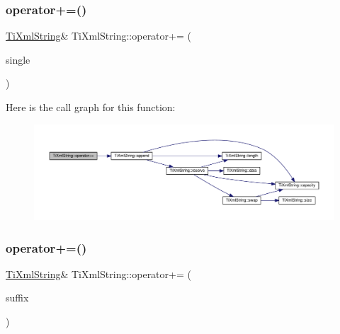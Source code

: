 \subsubsection{\texorpdfstring{operator+=()}{operator+=()}\hspace{0.1cm}{\footnotesize\ttfamily [2/3]}}
{\footnotesize\ttfamily \hyperlink{class_ti_xml_string}{Ti\+Xml\+String}\& Ti\+Xml\+String\+::operator+= (\begin{DoxyParamCaption}\item[{char}]{single }\end{DoxyParamCaption})\hspace{0.3cm}{\ttfamily [inline]}}

Here is the call graph for this function\+:
\nopagebreak
\begin{figure}[H]
\begin{center}
\leavevmode
\includegraphics[width=350pt]{class_ti_xml_string_a6aa09d5240470b76d54ec709e04f8c13_cgraph}
\end{center}
\end{figure}
\mbox{\label{class_ti_xml_string_afdcae5ea2b4d9e194dc21226b817f417}} 
\subsubsection{\texorpdfstring{operator+=()}{operator+=()}\hspace{0.1cm}{\footnotesize\ttfamily [3/3]}}
{\footnotesize\ttfamily \hyperlink{class_ti_xml_string}{Ti\+Xml\+String}\& Ti\+Xml\+String\+::operator+= (\begin{DoxyParamCaption}\item[{const \hyperlink{class_ti_xml_string}{Ti\+Xml\+String} \&}]{suffix }\end{DoxyParamCaption})\hspace{0.3cm}{\ttfamily [inline]}}

